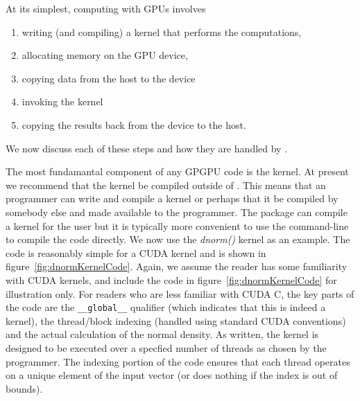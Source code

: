 \documentclass[article]{jss}
\def\R{\proglang{R}}
\def\Rpkg#1{\pkg{#1}}
\def\Cfunc#1{\textit{#1()}}
\begin{document}
At its simplest, computing with GPUs involves 
\begin{enumerate}
\item writing (and compiling) a kernel that performs the computations,
\item allocating memory on the GPU device, 
\item copying data from the host to the device
\item invoking the kernel
\item copying the results back from the device to the host.
\end{enumerate}
We now discuss each of these steps and how they are handled by \Rpkg{RCUDA}.

The most fundamantal component of any GPGPU code is the kernel. 
At present we recommend that the kernel be compiled outside of \R.  This
means that an \R{} programmer can write and compile a kernel or
perhaps that it be compiled by somebody else and made available to the
\R{} programmer.  The \Rpkg{RCUDA} package can compile a kernel for
the \R{} user but it is typically more convenient to use the command-line
to compile the code directly. We now use the \Cfunc{dnorm} kernel as an example.
The code is reasonably simple for a CUDA kernel and is shown in
figure~\ref{fig:dnormKernelCode}. Again, we assume the reader has some
familiarity with CUDA kernels, and include the code in figure~\ref{fig:dnormKernelCode}
for illustration only. For readers who are less familiar with CUDA C, 
the key parts of the code are the \texttt{\_\_global\_\_} 
qualifier (which indicates that this is indeed a kernel), the 
thread/block indexing (handled using standard CUDA conventions) and the
actual calculation of the normal density. As written, the kernel is designed 
to be executed over a specfied number of threads as chosen by the 
programmer. The indexing portion of the code ensures that each 
thread operates on a unique element of the input vector (or does nothing
if the index is out of bounds). 
\end{document}

